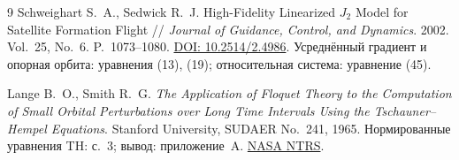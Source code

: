 \documentclass[a4paper,11pt]{article}
\numberwithin{equation}{section}
\theoremstyle{remark}
\begin{document}
\begin{thebibliography}{9}
Schweighart S.~A., Sedwick R.~J.
High-Fidelity Linearized $J_2$ Model for Satellite Formation Flight //
\textit{Journal of Guidance, Control, and Dynamics}.
2002. Vol.~25, No.~6. P.~1073--1080.
\href{https://doi.org/10.2514/2.4986}{DOI: 10.2514/2.4986}.
Усреднённый градиент и опорная орбита: уравнения (13), (19);
относительная система: уравнение (45).

Lange B.~O., Smith R.~G.
\textit{The Application of Floquet Theory to the Computation
of Small Orbital Perturbations over Long Time Intervals
Using the Tschauner--Hempel Equations}.
Stanford University, SUDAER No.~241, 1965.
Нормированные уравнения TH: с.~3; вывод: приложение~A.
\href{https://ntrs.nasa.gov/citations/19660000761}{NASA NTRS}.
\end{thebibliography}
\end{document}
